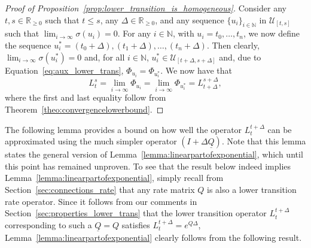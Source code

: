 \documentclass[10pt,a4paper]{paper}
\theoremstyle{definition}
\newcommand{\nats}{\mathbb{N}}
\newcommand{\reals}{\mathbb{R}}
\newcommand{\realsnonneg}{\reals_{\geq 0}}
\newcommand{\lrate}{\underline{Q}}
\begin{document}
\begin{proof}[Proof of Proposition~\ref{prop:lower_transition_is_homogeneous}]
Consider any $t,s\in\realsnonneg$ such that $t\leq s$, any $\Delta\in\realsnonneg$, and any sequence $\{u_i\}_{i\in\nats}$ in $\mathcal{U}_{[t,s]}$ such that $\lim_{i\to\infty}\sigma(u_i)=0$. %
For any $i\in\nats$, with $u_i=t_0,\ldots,t_n$, we now define the sequence $u_i^*=(t_0+\Delta),(t_1+\Delta),\ldots,(t_n+\Delta)$. Then clearly, $\lim_{i\to\infty}\sigma(u_i^*)=0$ and, for all $i\in\nats$, $u_i^*\in\mathcal{U}_{[t+\Delta,s+\Delta]}$ and, due to Equation~\eqref{eq:aux_lower_trans}, $\Phi_{u_i}=\Phi_{u_i^*}$.
We now have that
\begin{equation*}
L_t^s=\lim_{i\to\infty}\Phi_{u_i}=\lim_{i\to\infty}\Phi_{u_i^*}=L_{t+\Delta}^{s+\Delta},
\end{equation*}
where the first and last equality follow from Theorem~\ref{theo:convergencelowerbound}.
\end{proof}

The following lemma provides a bound on how well the operator $L_t^{t+\Delta}$ can be approximated using the much simpler operator $(I+\Delta\lrate)$. Note that this lemma states the general version of Lemma~\ref{lemma:linearpartofexponential}, which until this point has remained unproven. To see that the result below indeed implies Lemma~\ref{lemma:linearpartofexponential}, simply recall from Section~\ref{sec:connections_rate} that any rate matrix $Q$ is also a lower transition rate operator. Since it follows from our comments in Section~\ref{sec:properties_lower_trans} that the lower transition operator $L_t^{t+\Delta}$ corresponding to such a $\lrate=Q$ satisfies $L_t^{t+\Delta}=e^{Q\Delta}$, Lemma~\ref{lemma:linearpartofexponential} clearly follows from the following result.
\end{document}
